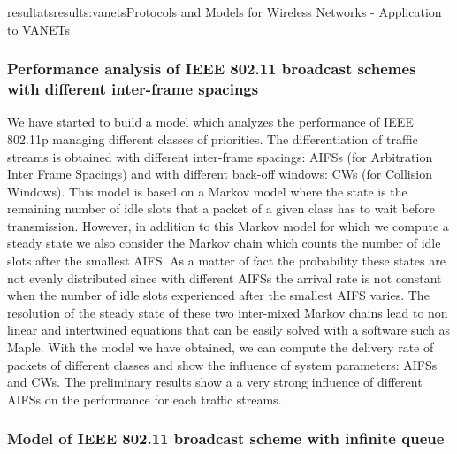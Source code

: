 \documentclass{ra2016}
\begin{document}
\begin{module}{resultats}{results:vanets}{Protocols and Models for Wireless Networks - Application to VANETs}

\subsubsection{Performance analysis of IEEE 802.11 broadcast schemes with different inter-frame spacings}

\begin{participants}
\end{participants}

We have started to build a model which analyzes the performance 
of IEEE 802.11p managing different classes of priorities. 
The differentiation of traffic streams is obtained with different 
inter-frame spacings:  AIFSs (for Arbitration Inter Frame Spacings) and with 
different back-off windows: CWs (for Collision Windows). 
This model is based on a Markov model where the state is the remaining 
number of idle slots that a packet of a given class has to wait before transmission. 
However, in addition to this Markov model for which we compute a steady state 
we also consider the Markov chain which counts the number of idle slots after 
the smallest AIFS. As a matter of fact the probability these states are not evenly 
distributed since with different AIFSs the arrival rate is not constant 
when the number of idle slots experienced after the smallest AIFS varies. 
The resolution of the steady state of these two inter-mixed Markov chains
lead to non linear and intertwined equations that can be easily  solved with a software 
such as Maple. 
With the model we have obtained, we can compute the delivery rate 
of packets of different classes and show the influence of system parameters: 
AIFSs and CWs. The preliminary results show a a very strong influence 
of different AIFSs on the performance for each traffic streams.  

\subsubsection{Model of IEEE 802.11 broadcast scheme with infinite queue}

\begin{participants}
\end{participants}


\end{module}
\end{document}
